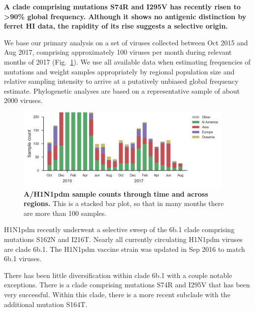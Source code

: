 \documentclass[11pt,oneside,letterpaper]{article}
\newcommand{\FIG}[1]{Fig.~\ref{#1}}
\begin{document}
\textbf{A clade comprising mutations S74R and I295V has recently risen
to \textgreater{}90\% global frequency. Although it shows no antigenic
distinction by ferret HI data, the rapidity of its rise suggests a
selective origin.}

We base our primary analysis on a set of viruses collected between Oct
2015 and Aug 2017, comprising approximately 100 viruses per month during
relevant months of 2017 (\FIG{h1n1pdm_counts}). We use all available data when estimating
frequencies of mutations and weight samples appropriately by regional
population size and relative sampling intensity to arrive at a
putatively unbiased global frequency estimate. Phylogenetic analyses are
based on a representative sample of about 2000 viruses.

\begin{figure}[H]
  \centering
  \includegraphics[width=0.95\textwidth]{../figures/sep-2017/h1n1pdm_counts.png}
  \caption{\textbf{A/H1N1pdm sample counts through time and across regions.}
  This is a stacked bar plot, so that in many months there are more than 100 samples.
  }
  \label{h1n1pdm_counts}
\end{figure}

H1N1pdm recently underwent a selective sweep of the 6b.1 clade
comprising mutations S162N and I216T. Nearly all currently circulating
H1N1pdm viruses are clade 6b.1. The H1N1pdm vaccine strain was updated
in Sep 2016 to match 6b.1 viruses.

There has been little diversification within clade 6b.1 with a couple
notable exceptions. There is a clade comprising mutations S74R and I295V
that has been very successful. Within this clade, there is a more recent
subclade with the additional mutation S164T.
\end{document}
